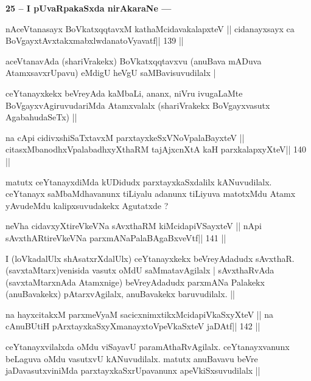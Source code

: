 \begin{artha}
{\bf 25 -- I pUvaRpakaSxda nirAkaraNe ---}
\end{artha}

\begin{shl}
nAceVtanasayx BoVkatxqqtavxM kathaMcidavakalapxteV ||
cidanayxsayx ca BoVgayxtAvxtakxmabxlwdanatoVyavatf\hfill || 139 ||
\end{shl}

\begin{artha}
aceVtanavAda (shariVrakekx) BoVkatxqqtavxvu (anuBava mADuva AtamxsavxrUpavu) eMdigU heVgU saMBavisuvudilalx |

ceYtanayxkekx beVreyAda kaMbaLi, ananx, niVru ivugaLaMte 
BoVgayxvAgiruvudariMda Atamxvalalx (shariVrakekx BoVgayxvasutx AgabahudaSeTx) ||
\end{artha}

\begin{shl}
na cApi cidivxshiSaTxtavxM parxtayxkeSxVNoVpalaBayxteV ||
citasxMbanodhxVpalabadhxyXthaRM tajAjxcnXtA kaH parxkalapxyXteV\hfill || 140 ||
\end{shl}

\begin{artha}
matutx ceYtanayxdiMda kUDidudx parxtayxkaSxdalilx kANuvudilalx. ceYtanayx saMbaMdhavanunx tiLiyalu adanunx tiLiyuva matotxMdu Atamx yAvudeMdu kalipxsuvudakekx Agutatxde ? 
\end{artha}

\begin{shl}
neVha cidavxyXtireVkeVNa sAvxthaRM kiMcidapiVSayxteV ||
nApi sAvxthARtireVkeVNa parxmANaPalaBAgaBxveVtf\hfill || 141 ||
\end{shl}

\begin{artha}
I (loVkadalUlx shAsatxrXdalUlx) ceYtanayxkekx beVreyAdadudx sAvxthaR. 
(savxtaMtarx)venisida vasutx oMdU saMmatavAgilalx | sAvxthaRvAda 
(savxtaMtarxnAda Atamxnige) beVreyAdadudx parxmANa Palakekx 
(anuBavakekx) pAtarxvAgilalx, anuBavakekx baruvudilalx. ||
\end{artha}

\begin{shl}
na hayxcitakxM parxmeVyaM sacicxnimxtikxMcidapiVkaSxyXteV ||
na cAnuBUtiH pArxtayxkaSxyXmanayxtoV\s peVkaSxteV jaDAtf\hfill || 142 ||
\end{shl}

\begin{artha}
ceYtanayxvilalxda oMdu viSayavU paramAthaRvAgilalx. ceYtanayxvanunx 
beLaguva oMdu vasutxvU kANuvudilalx. matutx anuBavavu beVre jaDavasutxviniMda parxtayxkaSxrUpavanunx apeVkiSxsuvudilalx ||
\end{artha}



